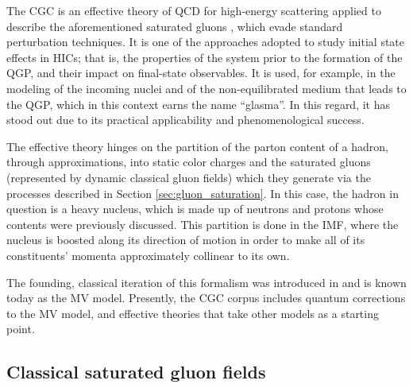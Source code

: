 
The \gls{CGC} is an effective theory of \gls{QCD} for high-energy %
scattering applied to describe the aforementioned saturated gluons \cite{Gelis_2010}, which evade standard perturbation techniques. It is one of the approaches adopted to study initial state effects in \glspl{HIC}; that is, the properties of the system prior to the formation of the \gls{QGP}, and their impact on final-state observables. It is used, for example, in the modeling of the incoming nuclei and of the non-equilibrated medium that leads to the \gls{QGP}, which in this context earns the name ``glasma''.  In this regard, it has stood out due to its practical applicability and phenomenological success. \cite{Albacete_2014} 

The effective theory hinges on the partition of the parton content of a hadron,
 through approximations, into static color charges and the saturated gluons (represented by dynamic classical gluon fields) which they generate via the processes described in Section \ref{sec:gluon_saturation}. \cite{Gelis_2010} In this case, the hadron in question is a heavy nucleus, which is made up of neutrons and protons whose contents were previously discussed. This partition is done in the \gls{IMF}, where the nucleus is boosted along its direction of motion in order to make all of its constituents' momenta approximately collinear to its own.


The founding, classical iteration of this formalism was introduced in \cite{McLerran_1994_classic_source} and is known today as the \gls{MV} model. Presently, the \gls{CGC} corpus includes quantum corrections to the \gls{MV} model, and effective theories that take other models as a starting point.


\subsection{Classical saturated gluon fields}

